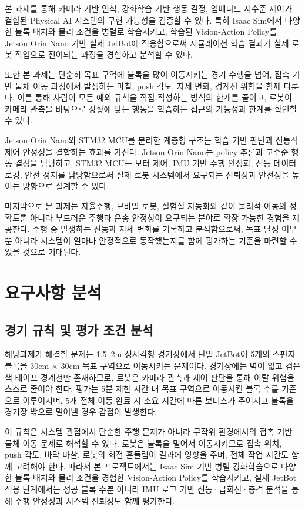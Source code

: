 \documentclass[titlepage]{pnureport}
\begin{document}
본 과제를 통해 카메라 기반 인식, 강화학습 기반 행동 결정, 임베디드 저수준 제어가 결합된 Physical AI 시스템의 구현 가능성을 검증할 수 있다. 특히 Isaac Sim에서 다양한 블록 배치와 물리 조건을 병렬로 학습시키고, 학습된 Vision-Action Policy를 Jetson Orin Nano 기반 실제 JetBot에 적용함으로써 시뮬레이션 학습 결과가 실제 로봇 작업으로 전이되는 과정을 경험하고 분석할 수 있다.

또한 본 과제는 단순히 목표 구역에 블록을 많이 이동시키는 경기 수행을 넘어, 접촉 기반 물체 이동 과정에서 발생하는 마찰, push 각도, 자세 변화, 경계선 위험을 함께 다룬다. 이를 통해 사람이 모든 예외 규칙을 직접 작성하는 방식의 한계를 줄이고, 로봇이 카메라 관측을 바탕으로 상황에 맞는 행동을 학습하는 접근의 가능성과 한계를 확인할 수 있다.

Jetson Orin Nano와 STM32 MCU를 분리한 계층형 구조는 학습 기반 판단과 전통적 제어 안정성을 결합하는 효과를 가진다. Jetson Orin Nano는 policy 추론과 고수준 행동 결정을 담당하고, STM32 MCU는 모터 제어, IMU 기반 주행 안정화, 진동 데이터 로깅, 안전 정지를 담당함으로써 실제 로봇 시스템에서 요구되는 신뢰성과 안전성을 높이는 방향으로 설계할 수 있다.

마지막으로 본 과제는 자율주행, 모바일 로봇, 실험실 자동화와 같이 물리적 이동의 정확도뿐 아니라 부드러운 주행과 운송 안정성이 요구되는 분야로 확장 가능한 경험을 제공한다. 주행 중 발생하는 진동과 자세 변화를 기록하고 분석함으로써, 목표 달성 여부뿐 아니라 시스템이 얼마나 안정적으로 동작했는지를 함께 평가하는 기준을 마련할 수 있을 것으로 기대된다.

\chapter{요구사항 분석}

\section{경기 규칙 및 평가 조건 분석}

해당과제가 해결할 문제는 1.5--2m 정사각형 경기장에서 단일 JetBot이 5개의 스펀지 블록을 30cm $\times$ 30cm 목표 구역으로 이동시키는 문제이다. 경기장에는 벽이 없고 검은색 테이프 경계선만 존재하므로, 로봇은 카메라 관측과 제어 판단을 통해 이탈 위험을 스스로 줄여야 한다. 평가는 5분 제한 시간 내 목표 구역으로 이동시킨 블록 수를 기준으로 이루어지며, 5개 전체 이동 완료 시 소요 시간에 따른 보너스가 주어지고 블록을 경기장 밖으로 밀어낼 경우 감점이 발생한다.

이 규칙은 시스템 관점에서 단순한 주행 문제가 아니라 무작위 환경에서의 접촉 기반 물체 이동 문제로 해석할 수 있다. 로봇은 블록을 밀어서 이동시키므로 접촉 위치, push 각도, 바닥 마찰, 로봇의 회전 흔들림이 결과에 영향을 주며, 전체 작업 시간도 함께 고려해야 한다. 따라서 본 프로젝트에서는 Isaac Sim 기반 병렬 강화학습으로 다양한 블록 배치와 물리 조건을 경험한 Vision-Action Policy를 학습시키고, 실제 JetBot 적용 단계에서는 성공 블록 수뿐 아니라 IMU 로그 기반 진동·급회전·충격 분석을 통해 주행 안정성과 시스템 신뢰성도 함께 평가한다.
\end{document}
